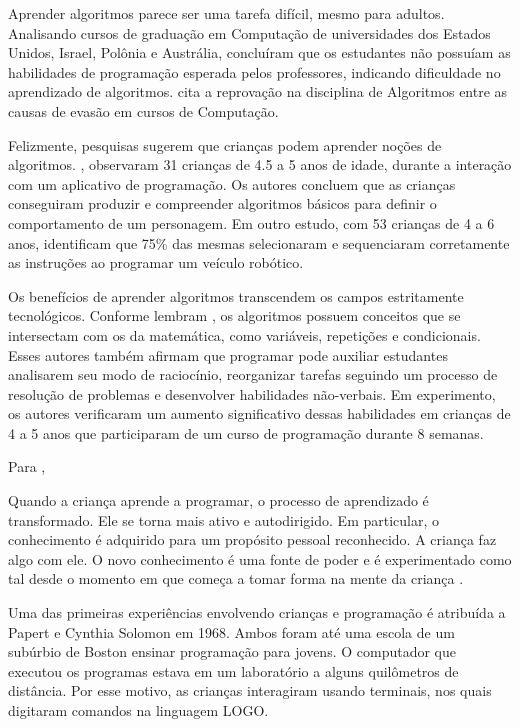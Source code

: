 Aprender algoritmos parece ser uma tarefa difícil, mesmo para adultos. Analisando cursos de graduação em Computação de universidades dos Estados Unidos, Israel, Polônia e Austrália,  concluíram que os estudantes não possuíam as habilidades de programação esperada pelos professores, indicando dificuldade no aprendizado de algoritmos.  cita a reprovação na disciplina de Algoritmos entre as causas de evasão em cursos de Computação. 

Felizmente, pesquisas sugerem que crianças podem aprender noções de algoritmos. , observaram 31 crianças de 4.5 a 5 anos de idade, durante a interação com um aplicativo de programação. Os autores concluem que as crianças conseguiram produzir e compreender algoritmos básicos para definir o comportamento de um personagem. Em outro estudo, com 53 crianças de 4 a 6 anos,  identificam que 75\% das mesmas selecionaram e sequenciaram corretamente as instruções ao programar um veículo robótico. 

Os benefícios de aprender algoritmos transcendem os campos estritamente tecnológicos. Conforme lembram , os algoritmos possuem conceitos que se intersectam com os da matemática, como variáveis, repetições e condicionais. Esses autores também afirmam que programar pode auxiliar estudantes analisarem seu modo de raciocínio, reorganizar tarefas seguindo um processo de resolução de problemas e desenvolver habilidades não-verbais. Em experimento, os autores verificaram um aumento significativo dessas habilidades em crianças de 4 a 5 anos que participaram de um curso de programação durante 8 semanas.

Para , 

\begin{citacao}
Quando a criança aprende a programar, o processo de aprendizado é transformado. Ele se torna mais ativo e autodirigido. Em particular, o conhecimento é adquirido para um propósito pessoal reconhecido. A criança faz algo com ele. O novo conhecimento é uma fonte de poder e é experimentado como tal desde o momento em que começa a tomar forma na mente da criança \cite[p.21, tradução nossa]{papert_exploration_1996}.
\end{citacao}

Uma das primeiras experiências envolvendo crianças e programação é atribuída a Papert e Cynthia Solomon em 1968. Ambos foram até uma escola de um subúrbio de Boston ensinar programação para jovens. O computador que executou os programas estava em um laboratório a alguns quilômetros de distância. Por esse motivo, as crianças interagiram usando terminais, nos quais digitaram comandos na linguagem LOGO. 

